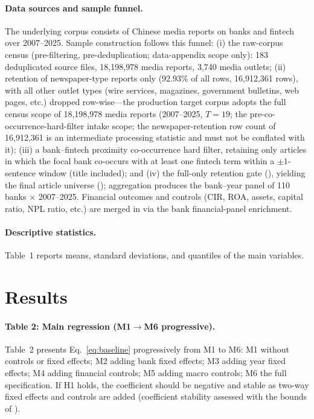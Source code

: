 \paragraph{Data sources and sample funnel.}
The underlying corpus consists of Chinese media reports on banks and fintech
over 2007--2025. Sample construction follows this funnel: (i) the raw-corpus
census (pre-filtering, pre-deduplication; data-appendix scope only): 183
deduplicated source files, 18{,}198{,}978 media reports, 3{,}740 media
outlets; (ii) retention of newspaper-type reports only (92.93\% of all rows,
16{,}912{,}361 rows), with all other outlet types (wire services, magazines,
government bulletins, web pages, etc.) dropped row-wise---the production
target corpus adopts the full census scope of 18{,}198{,}978 media reports
(2007--2025, $T=19$; the pre-co-occurrence-hard-filter intake scope; the
newspaper-retention row count of 16{,}912{,}361 is an intermediate
processing statistic and must not be conflated with it); (iii) a
bank--fintech proximity co-occurrence hard filter, retaining only articles
in which the focal bank co-occurs with at least one fintech term within a
$\pm1$-sentence window (title included); and (iv) the full-only retention
gate (), yielding the final article universe
();
aggregation produces the bank--year panel of 110 banks $\times$ 2007--2025.
Financial outcomes and
controls (CIR, ROA, assets, capital ratio, NPL ratio, etc.) are merged in
via the bank financial-panel enrichment.

\paragraph{Descriptive statistics.}
Table~1 reports means, standard deviations, and quantiles of the main
variables.

\section{Results}\label{sec:results}

\paragraph{Table 2: Main regression (M1$\to$M6 progressive).}
Table~2 presents Eq.~\eqref{eq:baseline} progressively from M1 to M6: M1
without controls or fixed effects; M2 adding bank fixed effects; M3 adding
year fixed effects; M4 adding financial controls; M5 adding macro controls;
M6 the full specification. If H1 holds, the  coefficient
should be negative and stable as two-way fixed effects and controls are
added (coefficient stability assessed with the bounds of
\parencite{oster2019unobservable}).


